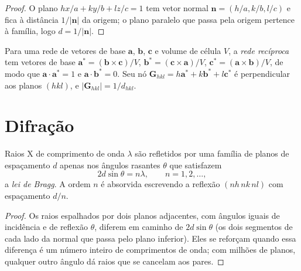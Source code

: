 \begin{proof}
O plano $hx/a + ky/b + lz/c = 1$ tem vetor normal $\mathbf n = (h/a, k/b, l/c)$
e fica à distância $1/|\mathbf n|$ da origem; o plano paralelo que passa pela
origem pertence à família, logo $d = 1/|\mathbf n|$.
\end{proof}

\begin{definition}\label{def:b3:x-ray-diffraction:reciprocal}
Para uma rede de vetores de base $\mathbf a$, $\mathbf b$, $\mathbf c$ e volume de célula $V$,
a \emph{rede recíproca} tem vetores de base
$\mathbf a^* = (\mathbf b\times\mathbf c)/V$, $\mathbf b^* = (\mathbf c\times\mathbf a)/V$,
$\mathbf c^* = (\mathbf a\times\mathbf b)/V$, de modo que $\mathbf a\cdot\mathbf a^* = 1$ e
$\mathbf a\cdot\mathbf b^* = 0$. Seu nó $\mathbf G_{hkl} = h\mathbf a^* + k\mathbf b^* + l\mathbf c^*$ é
perpendicular aos planos $(hkl)$, e $|\mathbf G_{hkl}| = 1/d_{hkl}$.
\end{definition}

\section{Difração}

\begin{theorem}\label{thm:b3:x-ray-diffraction:bragg}
Raios X de comprimento de onda $\lambda$ são refletidos por uma família de planos de
espaçamento $d$ apenas nos ângulos rasantes $\theta$ que satisfazem
\[
2d\sin\theta = n\lambda, \qquad n = 1, 2, \dots,
\]
a \emph{lei de Bragg}. A ordem $n$ é absorvida escrevendo a
reflexão $(nh\,nk\,nl)$ com espaçamento $d/n$.
\end{theorem}

\begin{proof}
Os raios espalhados por dois planos adjacentes, com ângulos iguais de incidência
e de reflexão $\theta$, diferem em caminho de $2d\sin\theta$ (os dois segmentos de cada lado
da normal que passa pelo plano inferior). Eles se reforçam quando essa diferença
é um número inteiro de comprimentos de onda; com milhões de planos, qualquer outro
ângulo dá raios que se cancelam aos pares.
\end{proof}

